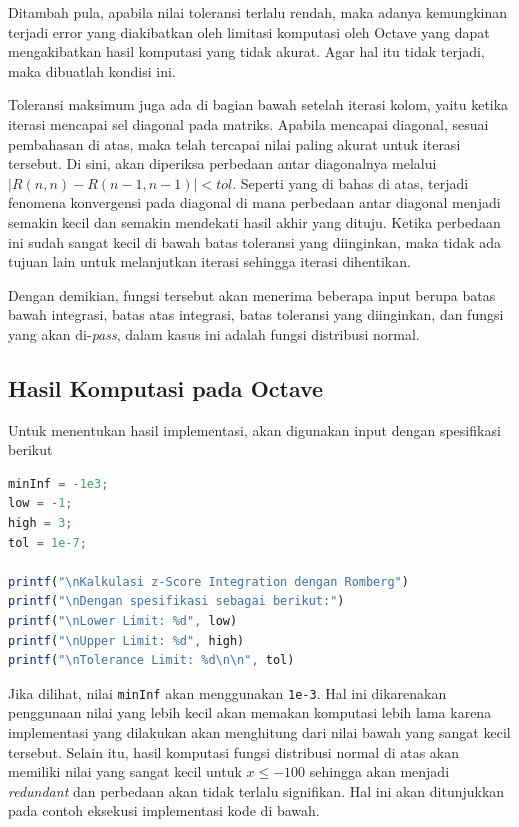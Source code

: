 \documentclass[journal,12pt,onecolumn,a4paper]{IEEEtran}
\begin{document}
Ditambah pula, apabila nilai toleransi terlalu rendah, maka adanya kemungkinan terjadi error yang diakibatkan oleh limitasi komputasi oleh Octave yang dapat mengakibatkan hasil komputasi yang tidak akurat. Agar hal itu tidak terjadi, maka dibuatlah kondisi ini.

Toleransi maksimum juga ada di bagian bawah setelah iterasi kolom, yaitu ketika iterasi mencapai sel diagonal pada matriks. Apabila mencapai diagonal, sesuai pembahasan di atas, maka telah tercapai nilai paling akurat untuk iterasi tersebut. Di sini, akan diperiksa perbedaan antar diagonalnya melalui \(|R(n,n)-R(n-1,n-1)| < tol\). Seperti yang di bahas di atas, terjadi fenomena konvergensi pada diagonal di mana perbedaan antar diagonal menjadi semakin kecil dan semakin mendekati hasil akhir yang dituju. Ketika perbedaan ini sudah sangat kecil di bawah batas toleransi yang diinginkan, maka tidak ada tujuan lain untuk melanjutkan iterasi sehingga iterasi dihentikan.

Dengan demikian, fungsi tersebut akan menerima beberapa input berupa batas bawah integrasi, batas atas integrasi, batas toleransi yang diinginkan, dan fungsi yang akan di-\emph{pass}, dalam kasus ini adalah fungsi distribusi normal.

\subsection{Hasil Komputasi pada Octave}

Untuk menentukan hasil implementasi, akan digunakan input dengan spesifikasi berikut

\begin{center}
	\begin{lstlisting}[language=Octave]
minInf = -1e3;
low = -1;
high = 3;
tol = 1e-7;

printf("\nKalkulasi z-Score Integration dengan Romberg")
printf("\nDengan spesifikasi sebagai berikut:")
printf("\nLower Limit: %d", low)
printf("\nUpper Limit: %d", high)
printf("\nTolerance Limit: %d\n\n", tol)
	\end{lstlisting}
\end{center}

Jika dilihat, nilai \lstinline{minInf} akan menggunakan \lstinline{1e-3}. Hal ini dikarenakan penggunaan nilai yang lebih kecil akan memakan komputasi lebih lama karena implementasi yang dilakukan akan menghitung dari nilai bawah yang sangat kecil tersebut. Selain itu, hasil komputasi fungsi distribusi normal di atas akan memiliki nilai yang sangat kecil untuk \(x \le -100\) sehingga akan menjadi \emph{redundant} dan perbedaan akan tidak terlalu signifikan. Hal ini akan ditunjukkan pada contoh eksekusi implementasi kode di bawah.
\end{document}
